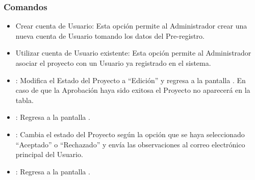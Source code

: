 \subsubsection{Comandos}
\begin{itemize}
 \item \IURadioButton Crear cuenta de Usuario: Esta opción permite al Administrador crear una nueva cuenta de Usuario tomando los datos del Pre-registro.
 \item \IURadioButton Utilizar cuenta de Usuario existente: Esta opción permite al Administrador asociar el proyecto con un Usuario ya registrado en el sistema.
 \item \IURadioButtonAceptado: Modifica el Estado del Proyecto a ``Edición'' y regresa a la pantalla . En caso de que la Aprobación haya sido exitosa el Proyecto no aparecerá en la tabla.
 \item \IURadioButtonRechazado: Regresa a la pantalla .
 \item {}: Cambia el estado del Proyecto según la opción que se haya seleccionado ``Aceptado'' o ``Rechazado'' y envía las observaciones al correo electrónico principal del Usuario.
 \item {}: Regresa a la pantalla .
\end{itemize}